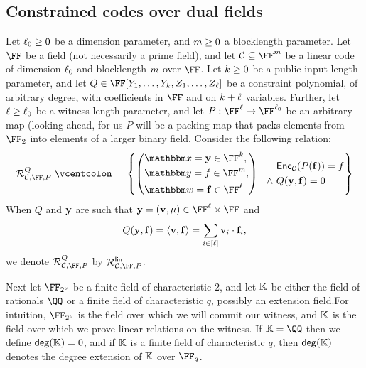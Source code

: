 \documentclass[11pt,letterpaper,usenames,dvipsnames]{article}
\begin{document}
\subsection{Constrained codes over dual fields }
Let $\ell_0\geq 0$ be a dimension parameter, and $m\geq 0$ a blocklength parameter. Let $\FF$ be a field (not necessarily a prime field), and let $\cC\subseteq \FF^{\codelength}$ be a linear code of dimension $\ell_0$ and blocklength $m$ over $\FF$.  Let $k\geq0$ be a public input length parameter, and let $Q\in \FF[Y_1, \ldots, Y_{\inplen}, Z_1, \ldots, Z_{\codedim}]$  be a constraint polynomial, of arbitrary degree, 
with coefficients in $\FF$ and on $k+\ell$ variables. Further, let $\ell\geq \ell_0$ be a witness length parameter, and let $P:\FF^{\codedim} \to \FF^{\codedim_0}$ be an arbitrary map (looking ahead, for us $P$ will be a packing map that packs elements from $\FF_2$ into elements of a larger binary field.     Consider the following relation:
%
$$
\Relation^Q_{\cC,\FF, P} \defeq \left\{ \left(\begin{aligned} &\inp=\yy\in \FF^\inplen, \\&\oracle = f \in \FF^\codelength, \\ &\wit= \bff\in \FF^\codedim\end{aligned}\right) \;\middle|\;  \begin{aligned} &\Enc_{\cC}(P(\bff)) = f\\ \wedge \  &Q(\yy, \bff) = 0  \end{aligned} \right\}
$$
When $Q$ and $\mathbf{y}$ are such that $\yy=(\vv,\mu)\in \FF^{\codedim}\times \FF$ and $$Q(\mathbf{y},\mathbf{f})= \langle \mathbf{v}, \mathbf{f}\rangle = \sum_{i\in [\ell]} \mathbf{v}_i \cdot \mathbf{f}_i,$$ we denote $\Relation^Q_{\cC,\FF, P}$  by $\Relation^{\mathsf{lin}}_{\cC,\FF,P}$.



Next let $\comfield$ be a finite field of characteristic $2$,  and let $\mathbb{K}$ be either the field of rationals $\QQ$ or a finite field of characteristic $q$, possibly an extension field.For intuition, $\comfield$ is the field over which we will commit our witness, and $\mathbb{K}$ is the field over which we prove linear relations on the witness. If $\evalfield=\QQ$ then we define $\mathsf{deg}(\mathbb{K})=0$, and if $\mathbb{K}$ is a finite field of characteristic $q$, then $\mathsf{deg}(\mathbb{K})$ denotes the degree extension of $\mathbb{K}$ over $\FF_q$.
\end{document}
